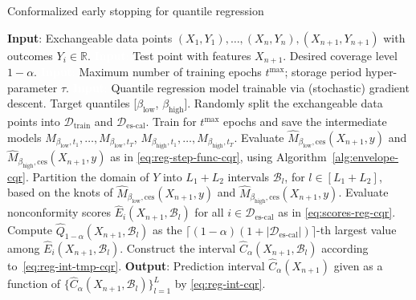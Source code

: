 \begin{algorithm}[H]
    \caption{Conformalized early stopping for quantile regression}
    \label{alg:reg-cqr}
    \begin{algorithmic}[1]
        \STATE \textbf{Input}: Exchangeable data points $(X_{1},Y_{1}), \ldots, (X_{n},Y_{n}), (X_{n+1},Y_{n+1})$ with outcomes $Y_i \in \mathbb{R}$.
        \STATE \textcolor{white}{\textbf{Input}:} Test point with features $X_{n+1}$. Desired coverage level $1-\alpha$.
        \STATE \textcolor{white}{\textbf{Input}:} Maximum number of training epochs $t^{\max}$; storage period hyper-parameter $\tau$.
        \STATE \textcolor{white}{\textbf{Input}:} Quantile regression model trainable via (stochastic) gradient descent. Target quantiles [$\beta_{\text{low}}$, $\beta_{\text{high}}$].
        \STATE Randomly split the exchangeable data points into $\mathcal{D}_{\text{train}}$ and $\mathcal{D}_{\text{es-cal}}$.
        \STATE Train for $t^{\text{max}}$ epochs and save the intermediate models $M_{\beta_{\text{low}}, t_1} , \dots, M_{\beta_{\text{low}}, t_T}$, $M_{\beta_{\text{high}}, t_1} , \dots, M_{\beta_{\text{high}}, t_T}$.
        \STATE Evaluate $\hat{M}_{\beta_{\text{low}},\text{ces}}(X_{n+1},y)$ and $\hat{M}_{\beta_{\text{high}},\text{ces}}(X_{n+1},y)$ as in \eqref{eq:reg-step-func-cqr}, using Algorithm~\ref{alg:envelope-cqr}.
        \STATE Partition the domain of $Y$ into $L_1+L_2$ intervals $\mathcal{B}_l$, for $l \in [L_1+L_2]$, based on the knots of $\hat{M}_{\beta_{\text{low}},\text{ces}}(X_{n+1},y)$ and $\hat{M}_{\beta_{\text{high}},\text{ces}}(X_{n+1},y)$.
        \STATE Evaluate nonconformity scores $\hat{E}_i(X_{n+1},\mathcal{B}_l)$ for all $i \in \mathcal{D}_{\text{es-cal}}$ as in \eqref{eq:scores-reg-cqr}.
        \STATE Compute $\hat{Q}_{1-\alpha}(X_{n+1},\mathcal{B}_l)$ as the $\lceil (1-\alpha)(1+|\mathcal{D}_{\text{es-cal}}|) \rceil$-th largest value among $\hat{E}_i(X_{n+1},\mathcal{B}_l)$.
 \STATE Construct the interval $\hat{C}_{\alpha}(X_{n+1}, \mathcal{B}_l)$ according to~\eqref{eq:reg-int-tmp-cqr}.
        \ENDFOR
        \STATE \textbf{Output}: Prediction interval $\hat{C}_{\alpha}(X_{n+1})$ given as a function of $\{\hat{C}_{\alpha}(X_{n+1}, \mathcal{B}_l)\}_{l=1}^{L}$ by \eqref{eq:reg-int-cqr}.
    \end{algorithmic}
\end{algorithm}



